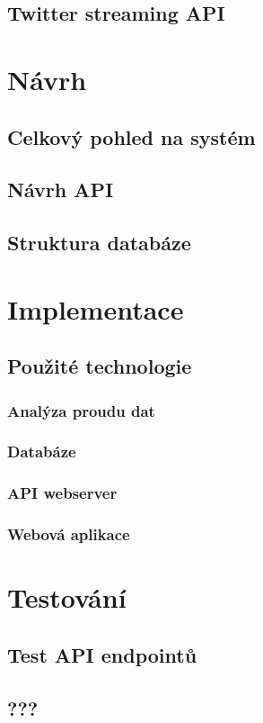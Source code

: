 \documentclass[thesis=B,czech]{FITthesis}[2012/06/26]
\begin{document}
\section{Twitter streaming API}

\chapter{Návrh}
\section{Celkový pohled na systém}
\section{Návrh API}
\section{Struktura databáze}

\chapter{Implementace}
\section{Použité technologie}
\subsection{Analýza proudu dat}
\subsection{Databáze}
\subsection{API webserver}
\subsection{Webová aplikace}

\chapter{Testování}
\section{Test API endpointů}
\section{???}
\end{document}
